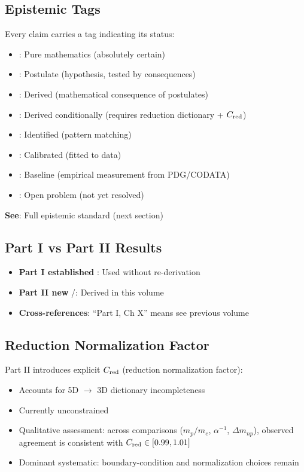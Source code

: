 \subsection{Epistemic Tags}

Every claim carries a tag indicating its status:

\begin{itemize}
\item \tagM: Pure mathematics (absolutely certain)
\item \tagP: Postulate (hypothesis, tested by consequences)
\item \tagDer: Derived (mathematical consequence of postulates)
\item \tagDc: Derived conditionally (requires reduction dictionary + $C_{\mathrm{red}}$)
\item \tagI: Identified (pattern matching)
\item \tagCal: Calibrated (fitted to data)
\item \tagBL: Baseline (empirical measurement from PDG/CODATA)
\item \tagOpen: Open problem (not yet resolved)
\end{itemize}

\textbf{See}: Full epistemic standard (next section)

\subsection{Part I vs Part II Results}

\begin{itemize}
\item \textbf{Part I established} \tagDer: Used without re-derivation
\item \textbf{Part II new} \tagDer/\tagDc: Derived in this volume
\item \textbf{Cross-references}: ``Part I, Ch X'' means see previous volume
\end{itemize}

\subsection{Reduction Normalization Factor}

Part II introduces explicit $C_{\mathrm{red}}$ (reduction normalization factor):
\begin{itemize}
\item Accounts for 5D $\to$ 3D dictionary incompleteness
\item Currently unconstrained \tagOpen{}
\item Qualitative assessment: across comparisons ($m_p/m_e$, $\alpha^{-1}$, $\Delta m_{np}$),
      observed agreement is consistent with $C_{\mathrm{red}} \in [0.99, 1.01]$ \tagI{}
\item Dominant systematic: boundary-condition and normalization choices remain \tagOpen{}
\end{itemize}

